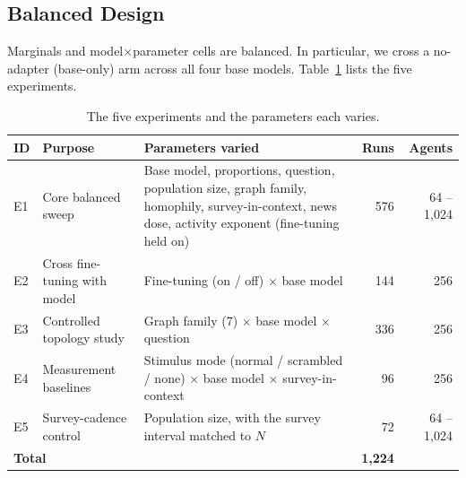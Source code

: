 \documentclass[letterpaper]{article} %
\begin{document}
\subsection{Balanced Design}
\label{sec:design}
Marginals and model$\times$parameter cells are balanced. In particular, we cross a no-adapter (base-only) arm across all four base models. Table~\ref{tab:experiments} lists the five experiments.

\begin{table}[htbp!]
\centering
\small
\setlength{\tabcolsep}{5pt}
\begin{tabular}{llp{10cm}rr}
\toprule
ID & Purpose & Parameters varied & Runs & Agents \\
\midrule
E1 & Core balanced sweep & Base model, proportions, question, population size, graph family, homophily, survey-in-context, news dose, activity exponent (fine-tuning held on) & 576 & 64 -- 1,024 \\
E2 & Cross fine-tuning with model & Fine-tuning (on / off) $\times$ base model & 144 & 256 \\
E3 & Controlled topology study & Graph family (7) $\times$ base model $\times$ question & 336 & 256 \\
E4 & Measurement baselines & Stimulus mode (normal / scrambled / none) $\times$ base model $\times$ survey-in-context & 96 & 256 \\
E5 & Survey-cadence control & Population size, with the survey interval matched to $N$ & 72 & 64 -- 1,024 \\
\midrule
\multicolumn{3}{l}{\textbf{Total}} & \textbf{1{,}224} & \\
\bottomrule
\end{tabular}
\caption{The five experiments and the parameters each varies.}
\label{tab:experiments}
\end{table}

\end{document}
